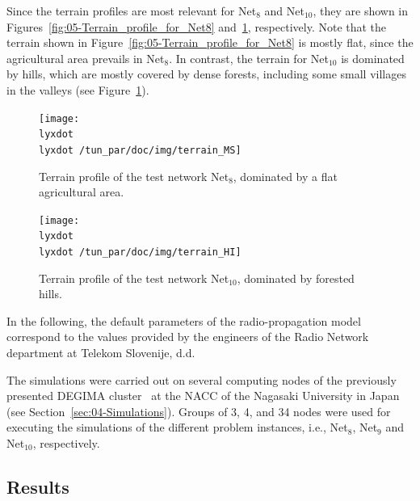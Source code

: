 Since the terrain profiles are most relevant for Net$_{8}$ and Net$_{10}$,
they are shown in Figures~\ref{fig:05-Terrain_profile_for_Net8}
and~\ref{fig:05-Terrain_profile_for_Net10}, respectively. Note that
the terrain shown in Figure~\ref{fig:05-Terrain_profile_for_Net8}
is mostly flat, since the agricultural area prevails in Net$_{8}$.
In contrast, the terrain for Net$_{10}$ is dominated by hills, which
are mostly covered by dense forests, including some small villages
in the valleys (see Figure~\ref{fig:05-Terrain_profile_for_Net10}).

\begin{figure}
\begin{minipage}[t]{0.49\textwidth}%
\centering

\texttt{[image: \\lyxdot \\lyxdot /tun\_par/doc/img/terrain\_MS]}

\caption{Terrain profile of the test network Net$_{8}$, dominated by a flat
agricultural area. \label{fig:05-Terrain_profile_for_Net8}}
%
\end{minipage}\hfill{}%
\begin{minipage}[t]{0.49\textwidth}%
\centering

\texttt{[image: \\lyxdot \\lyxdot /tun\_par/doc/img/terrain\_HI]}

\caption{Terrain profile of the test network Net$_{10}$, dominated by forested
hills. \label{fig:05-Terrain_profile_for_Net10}}
%
\end{minipage}
\end{figure}


In the following, the default parameters of the radio-propagation
model correspond to the values provided by the engineers of the Radio
Network department at Telekom Slovenije, d.d.

\bigskip{}


The simulations were carried out on several computing nodes of the
previously presented DEGIMA cluster~\cite{Hamada_Cluster_of_GPUs:2010}
at the NACC of the Nagasaki University in Japan (see Section~\ref{sec:04-Simulations}).
Groups of 3, 4, and 34 nodes were used for executing the simulations
of the different problem instances, i.e., Net$_{8}$, Net$_{9}$ and
Net$_{10}$, respectively.


\subsection{Results \label{sub:05-Least_squares_results}}

